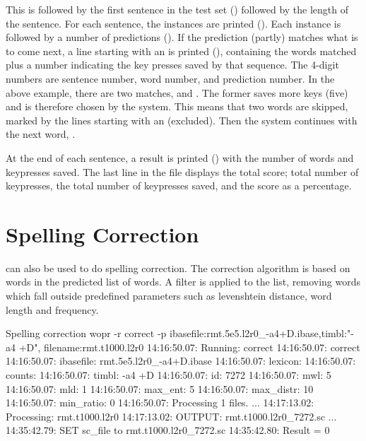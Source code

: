 \documentclass[a4paper,10pt,twoside]{report}
\begin{document}
This is followed by the first sentence in the test set () followed by
the length of the sentence. For each sentence, the instances are printed
(). Each instance is followed by a number of predictions
(). If the prediction (partly) matches what is to come
next, a line starting with an  is printed (),
containing the words matched plus a number indicating the key presses saved by
that sequence. The 4-digit numbers are sentence number, word number, and
prediction number. In the above example, there are two matches,
 and . The former saves more keys
(five) and is therefore chosen by the system. This means that two words are
skipped, marked by the lines starting with an  (excluded). Then the
system continues with the next word, .

At the end of each sentence, a result is printed () with the number
of words and keypresses saved. The last line in the file displays the total
score; total number of keypresses, the total number of keypresses saved, and the
score as a percentage.

\section{Spelling Correction}

\Wopr{} can also be used to do spelling correction. The correction
algorithm is based on words in the predicted list of words. A filter
is applied to the list, removing words which fall outside predefined
parameters such as levenshtein distance, word length and frequency.

\begin{bash}{Spelling correction}
wopr -r correct -p ibasefile:rmt.5e5.l2r0_-a4+D.ibase,timbl:"-a4 +D",
                   filename:rmt.t1000.l2r0
14:16:50.07: Running: correct
14:16:50.07: correct
14:16:50.07:  ibasefile:  rmt.5e5.l2r0_-a4+D.ibase
14:16:50.07:  lexicon:    
14:16:50.07:  counts:     
14:16:50.07:  timbl:      -a4 +D
14:16:50.07:  id:         7272
14:16:50.07:  mwl:        5
14:16:50.07:  mld:        1
14:16:50.07:  max_ent:    5
14:16:50.07:  max_distr:  10
14:16:50.07:  min_ratio:  0
14:16:50.07: Processing 1 files.
...
14:17:13.02: Processing: rmt.t1000.l2r0
14:17:13.02: OUTPUT:     rmt.t1000.l2r0_7272.sc
...
14:35:42.79:  SET sc_file to rmt.t1000.l2r0_7272.sc
14:35:42.80: Result = 0
\end{bash}
\end{document}
